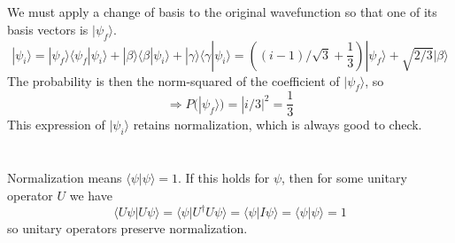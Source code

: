 \documentclass{article}
\begin{document}
\section{}
We must apply a change of basis to the original wavefunction so that one of its basis vectors is $|\psi_{f}\rangle$.
\[|\psi_{i}\rangle=|\psi_{f}\rangle\langle \psi_{f}|\psi_{i} \rangle+|\beta\rangle\langle \beta|\psi_{i} \rangle+|\gamma\rangle\langle \gamma|\psi_{i} \rangle=((i-1)/\sqrt{3}+\frac{1}{3})|\psi_{f}\rangle+\sqrt{2/3}|\beta\rangle\]
The probability is then the norm-squared of the coefficient of $|\psi_{f}\rangle$, so
\[\Rightarrow P(|\psi_{f}\rangle)=|i/3|^{2}=\frac{1}{3}\]
This expression of $|\psi_{i}\rangle$ retains normalization, which is always good to check.

\section{}
Normalization means $\langle \psi|\psi \rangle=1$. If this holds for $\psi$, then for some unitary operator $U$ we have
\[\langle U\psi|U\psi \rangle=\langle  \psi | U^{\dagger}U\psi \rangle=\langle \psi | I\psi \rangle=\langle  \psi|\psi \rangle=1\]
so unitary operators preserve normalization.
\end{document}
